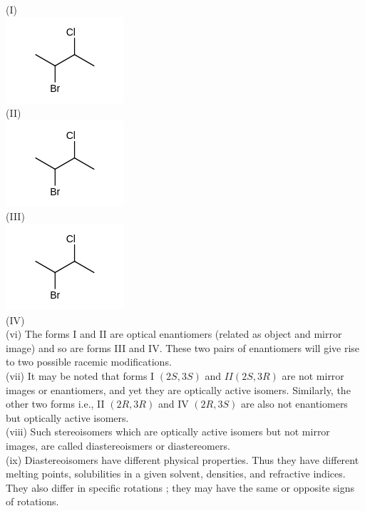 \documentclass[10pt]{article}
\begin{document}
(I)\\
\includegraphics{smile-314e011b2559451581d9b9f1a68081d7360e1140}\\
(II)\\
\includegraphics{smile-f1461e78c26fc1eb0317d250f841eae3597c5f8b}\\
(III)\\
\includegraphics{smile-6630f454a52c53a396d3c8c306e0a31cbfefc2bc}\\
(IV)\\
(vi) The forms I and II are optical enantiomers (related as object and mirror image) and so are forms III and IV. These two pairs of enantiomers will give rise to two possible racemic modifications.\\
(vii) It may be noted that forms I $(2 S, 3 S)$ and $I I(2 S, 3 R)$ are not mirror images or enantiomers, and yet they are optically active isomers. Similarly, the other two forms i.e., II $(2 R, 3 R)$ and IV $(2 R, 3 S)$ are also not enantiomers but optically active isomers.\\
(viii) Such stereoisomers which are optically active isomers but not mirror images, are called diastereoismers or diastereomers.\\
(ix) Diastereoisomers have different physical properties. Thus they have different melting points, solubilities in a given solvent, densities, and refractive indices. They also differ in specific rotations ; they may have the same or opposite signs of rotations.
\end{document}
